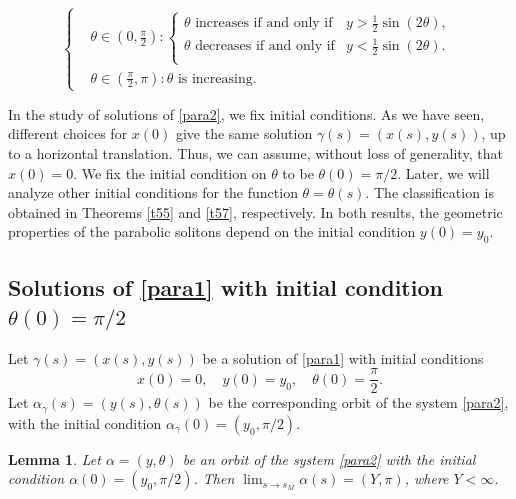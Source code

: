 \documentclass[12pt]{amsart}
\theoremstyle{plain}
\newtheorem{lemma}[theorem]{Lemma}
\theoremstyle{definition}
\begin{document}
\begin{equation*}
\left\{\begin{split}
& \theta \in (0, \frac{\pi}{2} ) \colon  \left\{\begin{array}{ll}
\theta \text{ increases if and only if} &  y >\frac{1}{2}\sin(2 \theta), \\
\theta \text{ decreases if and only if} &  y < \frac{1}{2}\sin(2 \theta).\\
\end{array}\right.\\
& \theta \in ( \frac{\pi}{2},\pi) \colon\mbox{$\theta$ is increasing}.
\end{split}\right.
\end{equation*}
 
 In the study of solutions of \eqref{para2}, we fix initial conditions. As we have seen,   different choices for  $x(0)$ give the same solution $\gamma(s)=(x(s),y(s))$, up to a horizontal translation. Thus, we can assume, without loss of generality, that $x(0)=0$. We fix the initial condition on $\theta $ to be $\theta(0)=\pi/2$.  Later, we will analyze other initial conditions for the function $\theta = \theta(s)$. The classification is obtained in Theorems \ref{t55} and \ref{t57}, respectively. In both results, the geometric properties of the parabolic solitons  depend on the initial condition $y(0)=y_0$. 
 
 
 
\subsection{Solutions of \eqref{para1} with initial condition $\theta(0) = \pi / 2$}

Let $\gamma(s)=(x(s),y(s))$ be a solution of \eqref{para1} with initial conditions 
$$x(0)=0,\quad y(0)=y_0,\quad \theta(0)=\frac{\pi}{2}.$$
Let $\alpha_\gamma(s) = (y(s), \theta(s))$ be the corresponding orbit of the system \eqref{para2}, with the initial condition $\alpha_\gamma(0) = (y_0, \pi / 2)$. 


\begin{lemma}\label{le54}
    Let $\alpha = (y,\theta)$ be an orbit of the system \eqref{para2} with the initial condition $\alpha(0) = (y_0, \pi/2)$. Then $\lim_{s \to s_M} \alpha(s) = (Y, \pi)$, where $Y < \infty$.
\end{lemma}
\end{document}
